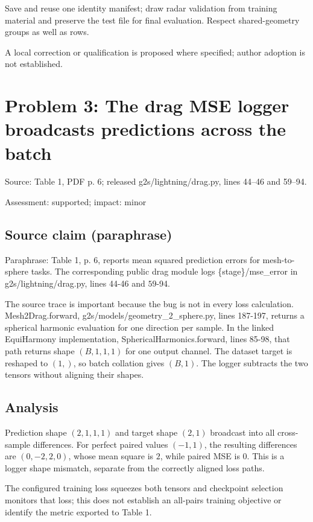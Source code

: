 \documentclass[11pt]{article}
\begin{document}
Save and reuse one identity manifest; draw radar validation from training material and preserve the test file for final evaluation. Respect shared-geometry groups as well as rows.

A local correction or qualification is proposed where specified; author adoption is not established.

\section*{Problem 3: The drag MSE logger broadcasts predictions across the batch}

Source: Table 1, PDF p. 6; released g2s/lightning/drag.py, lines 44–46 and 59–94.

Assessment: supported; impact: minor

\subsection*{Source claim (paraphrase)}

Paraphrase: Table 1, p. 6, reports mean squared prediction errors for mesh-to-sphere tasks. The corresponding public drag module logs \{stage\}/mse\_error in g2s/lightning/drag.py, lines 44-46 and \(59\)-94.

The source trace is important because the bug is not in every loss calculation. Mesh2Drag.forward, g2s/models/geometry\_2\_sphere.py, lines 187-197, returns a spherical harmonic evaluation for one direction per sample. In the linked EquiHarmony implementation, SphericalHarmonics.forward, lines 85-98, that path returns shape \((B,1,1,1)\) for one output channel. The dataset target is reshaped to \((1,)\), so batch collation gives \((B,1)\). The logger subtracts the two tensors without aligning their shapes.

\subsection*{Analysis}

Prediction shape \((2,1,1,1)\) and target shape \((2,1)\) broadcast into all cross-sample differences. For perfect paired values \((-1,1)\), the resulting differences are \((0,-2,2,0)\), whose mean square is \(2\), while paired MSE is \(0\). This is a logger shape mismatch, separate from the correctly aligned loss paths.

The configured training loss squeezes both tensors and checkpoint selection monitors that loss; this does not establish an all-pairs training objective or identify the metric exported to Table 1.
\end{document}
